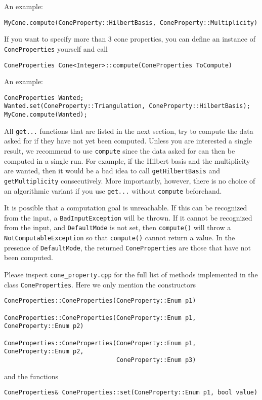 \documentclass[12pt,a4paper]{scrartcl}
\theoremstyle{definition}
\begin{document}
\begin{small}
An example:
\begin{Verbatim}
MyCone.compute(ConeProperty::HilbertBasis, ConeProperty::Multiplicity)
\end{Verbatim}

If you want to specify more than $3$ cone properties, you can define an instance of \verb|ConeProperties| yourself and call
\begin{Verbatim}
ConeProperties Cone<Integer>::compute(ConeProperties ToCompute)
\end{Verbatim}

An example:
\begin{Verbatim}
ConeProperties Wanted;
Wanted.set(ConeProperty::Triangulation, ConeProperty::HilbertBasis);
MyCone.compute(Wanted);
\end{Verbatim}

All \verb|get...| functions that are listed in the next section, try to compute the data asked for if they have not yet been computed. Unless you are interested a single result, we recommend to use \verb|compute| since the data asked for can then be computed in a single run. For example, if the Hilbert basis and the multiplicity are wanted, then it would be a bad idea to call \verb|getHilbertBasis| and \verb|getMultiplicity| consecutively. More importantly, however, there is no choice of an algorithmic variant if you use \verb|get...| without \verb|compute| beforehand.

It is possible that a computation goal is unreachable. If this can be recognized from the input, a \verb|BadInputException| will be thrown. If it cannot be recognized from the input, and \verb|DefaultMode| is not set, then \verb|compute()| will throw a \verb|NotComputableException| so that \verb|compute()| cannot return a value. In the presence of \verb|DefaultMode|, the returned \verb|ConeProperties| are those that have not been computed.

Please inspect \verb|cone_property.cpp| for the full list of methods implemented in the class \verb|ConeProperties|. Here we only mention the constructors
\begin{Verbatim}
ConeProperties::ConeProperties(ConeProperty::Enum p1)

ConeProperties::ConeProperties(ConeProperty::Enum p1, ConeProperty::Enum p2)

ConeProperties::ConeProperties(ConeProperty::Enum p1, ConeProperty::Enum p2,
                               ConeProperty::Enum p3)
\end{Verbatim}
and the functions
\begin{Verbatim}
ConeProperties& ConeProperties::set(ConeProperty::Enum p1, bool value)


\end{Verbatim}
\end{small}
\end{document}
